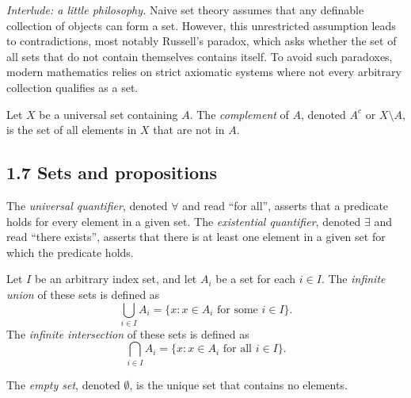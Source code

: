 \documentclass[../ium.tex]{subfiles}
\begin{document}
\begin{remark}
\textit{Interlude: a little philosophy.} Naive set theory assumes that any definable collection of objects can form a set. However, this unrestricted assumption leads to contradictions, most notably Russell's paradox, which asks whether the set of all sets that do not contain themselves contains itself. To avoid such paradoxes, modern mathematics relies on strict axiomatic systems where not every arbitrary collection qualifies as a set.
\end{remark}

\begin{definition}
\begin{shaded*}
Let $X$ be a universal set containing $A$. The \textit{complement} of $A$, denoted $A^c$ or $X \setminus A$, is the set of all elements in $X$ that are not in $A$.
\end{shaded*}
\end{definition}

\subsection*{1.7 Sets and propositions}

\begin{definition}
\begin{shaded*}
The \textit{universal quantifier}, denoted $\forall$ and read ``for all'', asserts that a predicate holds for every element in a given set. The \textit{existential quantifier}, denoted $\exists$ and read ``there exists'', asserts that there is at least one element in a given set for which the predicate holds.
\end{shaded*}
\end{definition}

\begin{definition}
\begin{shaded*}
Let $I$ be an arbitrary index set, and let $A_i$ be a set for each $i \in I$. The \textit{infinite union} of these sets is defined as
\[
\bigcup_{i \in I} A_i = \{ x : x \in A_i \text{ for some } i \in I \}.
\]
The \textit{infinite intersection} of these sets is defined as
\[
\bigcap_{i \in I} A_i = \{ x : x \in A_i \text{ for all } i \in I \}.
\]
\end{shaded*}
\end{definition}

\begin{definition}
\begin{shaded*}
The \textit{empty set}, denoted $\emptyset$, is the unique set that contains no elements.
\end{shaded*}
\end{definition}
\end{document}
